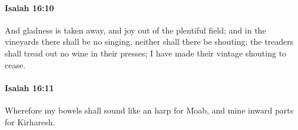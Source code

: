 		\paragraph{Isaiah 16:10} %
			\label{ISAIAH-16-10}

			And gladness is taken away, and joy out of the plentiful field; and in the vineyards there shall be no singing, neither shall there be shouting: the treaders shall tread out no wine in their presses; I have made their vintage shouting to cease.


		\paragraph{Isaiah 16:11} %
			\label{ISAIAH-16-11}

			Wherefore my bowels shall sound like an harp for Moab, and mine inward parts for Kirharesh.


